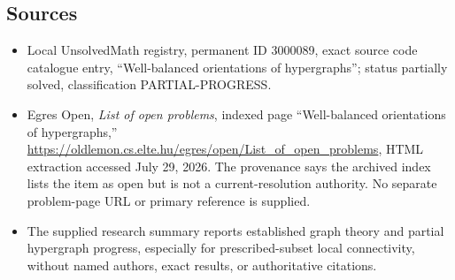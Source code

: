 \documentclass[11pt]{article}
\begin{document}
\subsection{Sources}
\begin{itemize}
\item Local UnsolvedMath registry, permanent ID 3000089, exact source code catalogue entry, ``Well-balanced orientations of hypergraphs''; status partially solved, classification PARTIAL-PROGRESS.
\item Egres Open, \emph{List of open problems}, indexed page ``Well-balanced orientations of hypergraphs,'' \url{https://oldlemon.cs.elte.hu/egres/open/List_of_open_problems}, HTML extraction accessed July 29, 2026. The provenance says the archived index lists the item as open but is not a current-resolution authority. No separate problem-page URL or primary reference is supplied.
\item The supplied research summary reports established graph theory and partial hypergraph progress, especially for prescribed-subset local connectivity, without named authors, exact results, or authoritative citations.
\end{itemize}
\end{document}

